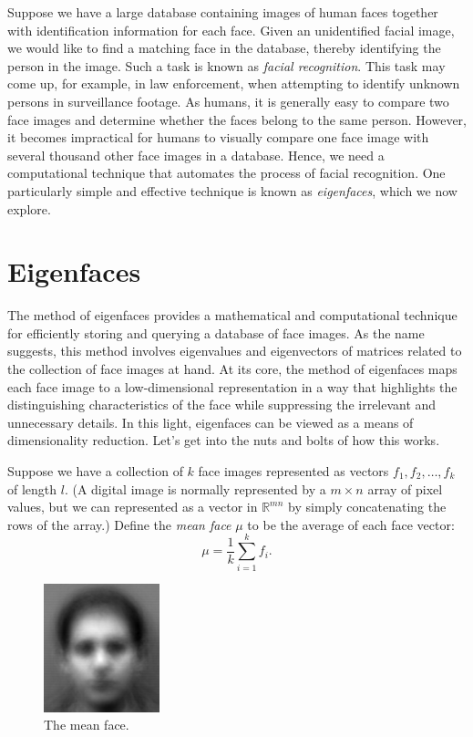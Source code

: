\label{lab:FacialRecognition}


Suppose we have a large database containing images of human faces together with identification information for each face.
Given an unidentified facial image, we would like to find a matching face in the database, thereby identifying the person in the image.
Such a task is known as \emph{facial recognition}.
This task may come up, for example, in law enforcement, when attempting to identify unknown persons in surveillance footage.
As humans, it is generally easy to compare two face images and determine whether the faces belong to the same person.
However, it becomes impractical for humans to visually compare one face image with several thousand other face images in a database.
Hence, we need a computational technique that automates the process of facial recognition.
One particularly simple and effective technique is known as \emph{eigenfaces}, which we now explore.

\section*{Eigenfaces}
The method of eigenfaces provides a mathematical and computational technique for efficiently storing and querying a database of face images.
As the name suggests, this method involves eigenvalues and eigenvectors of matrices related to the collection of face images at hand.
At its core, the method of eigenfaces maps each face image to a low-dimensional representation in a way that highlights the distinguishing
characteristics of the face while suppressing the irrelevant and unnecessary details.
In this light, eigenfaces can be viewed as a means of dimensionality reduction.
Let's get into the nuts and bolts of how this works.

Suppose we have a collection of $k$ face images represented as vectors $f_1, f_2, \ldots, f_k$ of length $l$.
(A digital image is normally represented by a $m \times n$ array of pixel values, but we can represented as a vector in $\mathbb{R}^{mn}$ by simply concatenating the rows of the array.)
Define the \emph{mean face} $\mu$ to be the average of each face vector:
\[
\mu = \frac{1}{k}\sum_{i=1}^k f_i.
\]
\begin{figure}
\includegraphics[width=0.3\textwidth]{meanFace.png}
\caption{The mean face.}
\label{facialRecognition:meanFace}
\end{figure}



